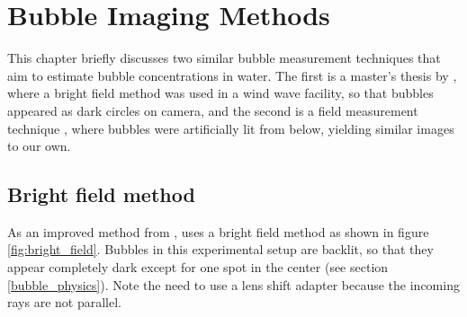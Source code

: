 
\chapter{Bubble Imaging Methods} \label{related_work}
 

This chapter briefly discusses two similar bubble measurement techniques that aim to estimate bubble concentrations in water. The first is a master's thesis by \citet{Leonie}, where a bright field method was used in a wind wave facility, so that bubbles appeared as dark circles on camera, and the second is a field measurement technique \citep{Al-Lashi2016}, where bubbles were artificially lit from below, yielding similar images to our own. 

\section{Bright field method}
	As an improved method from \citet{MischlerDiss}, \citet{Leonie} uses a bright field method as shown in figure \ref{fig:bright_field}. Bubbles in this experimental setup are backlit, so that they appear completely dark except for one spot in the center (see section  \ref{bubble_physics}). Note the need to use a lens shift adapter because the incoming rays are not parallel. 
	
